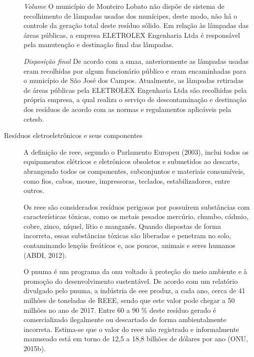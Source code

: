 \begin{description}
		\subitem \textit{Volume}
		O município de Monteiro Lobato não dispõe de sistema de recolhimento de lâmpadas usadas dos munícipes, deste modo, não há o controle da geração total deste resíduo sólido.
		Em relação às lâmpadas das áreas públicas, a empresa ELETROLEX Engenharia Ltda é responsável pela manutenção e destinação final das lâmpadas.
	
		\subitem \textit{Disposição final}
		De acordo com a \gls{smaa}, anteriormente as lâmpadas usadas eram recolhidas por algum funcionário público e eram encaminhadas para o município de São José dos Campos.
		Atualmente, as lâmpadas retiradas de áreas públicas pela ELETROLEX Engenharia Ltda são recolhidas pela própria empresa, a qual realiza o serviço de descontaminação e destinação dos resíduos de acordo com as normas e regulamentos aplicáveis pela \gls{cetesb}.
	
	
	\item[Resíduos eletroeletrônicos e seus componentes] A definição de \gls{reee}, segundo o Parlamento Europeu (2003), inclui todos os equipamentos elétricos e eletrônicos obsoletos e submetidos ao descarte, abrangendo todos os componentes, subconjuntos e materiais consumíveis, como fios, cabos, mouse, impressoras, teclados, estabilizadores, entre outros.
	
	Os \gls{reee} são considerados resíduos perigosos por possuírem substâncias com características tóxicas, como os metais pesados mercúrio, chumbo, cádmio, cobre, zinco, níquel, lítio e manganês. Quando dispostas de forma incorreta, essas substâncias tóxicas são liberadas e penetram no solo, contaminando lençóis freáticos e, aos poucos, animais e seres humanos (ABDI, 2012).
	
	O \gls{pnuma} é um programa da \gls{onu} voltado à proteção do meio ambiente e à promoção do desenvolvimento sustentável. De acordo com um relatório divulgado pelo \gls{pnuma}, a indústria de \gls{eee} produz, a cada ano, cerca de 41 milhões de toneladas de REEE, sendo que este valor pode chegar a 50 milhões no ano de 2017. Entre 60 a 90 \% deste resíduo gerado é comercializado ilegalmente ou descartado de forma ambientalmente incorreta. Estima-se que o valor do \gls{reee} não registrado e informalmente manuseado está em torno de 12,5 a 18,8 bilhões de dólares por ano (ONU, 2015b).
	

\end{description}
